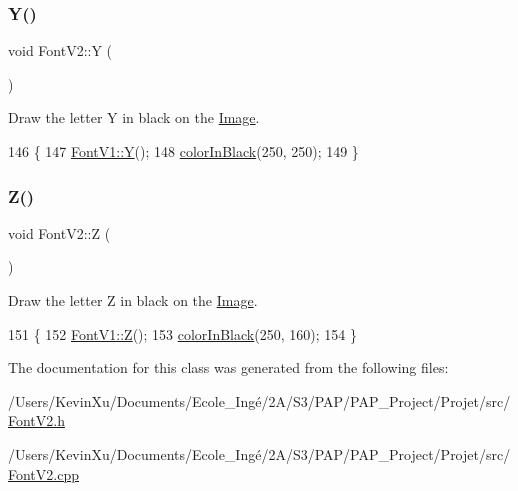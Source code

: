 \subsubsection{\texorpdfstring{Y()}{Y()}}
{\footnotesize\ttfamily void Font\+V2\+::Y (\begin{DoxyParamCaption}{ }\end{DoxyParamCaption})}



Draw the letter Y in black on the \mbox{\hyperlink{class_image}{Image}}. 


\begin{DoxyCode}
146                \{
147     \mbox{\hyperlink{class_font_v1_a25827e105e44581040d8c17cc821e4f3}{FontV1::Y}}();
148     \mbox{\hyperlink{class_font_v2_a04f2501961bc286ce70fbb6a840b0e8a}{colorInBlack}}(250, 250);
149 \}
\end{DoxyCode}
\mbox{\label{class_font_v2_a9650b871667f1c226d6e0e042f311a51}} 
\subsubsection{\texorpdfstring{Z()}{Z()}}
{\footnotesize\ttfamily void Font\+V2\+::Z (\begin{DoxyParamCaption}{ }\end{DoxyParamCaption})}



Draw the letter Z in black on the \mbox{\hyperlink{class_image}{Image}}. 


\begin{DoxyCode}
151                \{
152     \mbox{\hyperlink{class_font_v1_a10df574bc5aa14a43988d42db4e89504}{FontV1::Z}}();
153     \mbox{\hyperlink{class_font_v2_a04f2501961bc286ce70fbb6a840b0e8a}{colorInBlack}}(250, 160);
154 \}
\end{DoxyCode}


The documentation for this class was generated from the following files\+:\begin{DoxyCompactItemize}
\item 
/\+Users/\+Kevin\+Xu/\+Documents/\+Ecole\+\_\+\+Ingé/2\+A/\+S3/\+P\+A\+P/\+P\+A\+P\+\_\+\+Project/\+Projet/src/\mbox{\hyperlink{_font_v2_8h}{Font\+V2.\+h}}\item 
/\+Users/\+Kevin\+Xu/\+Documents/\+Ecole\+\_\+\+Ingé/2\+A/\+S3/\+P\+A\+P/\+P\+A\+P\+\_\+\+Project/\+Projet/src/\mbox{\hyperlink{_font_v2_8cpp}{Font\+V2.\+cpp}}\end{DoxyCompactItemize}
